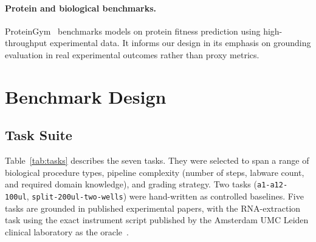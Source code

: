 \documentclass[11pt,a4paper]{article}
\begin{document}
\paragraph{Protein and biological benchmarks.}
ProteinGym~\citep{notin2023proteingym} benchmarks models on protein fitness
prediction using high-throughput experimental data.
It informs our design in its emphasis on grounding evaluation in real
experimental outcomes rather than proxy metrics.

\section{Benchmark Design}
\label{sec:design}

\subsection{Task Suite}
\label{sec:tasks}

Table~\ref{tab:tasks} describes the seven tasks.
They were selected to span a range of biological procedure types, pipeline
complexity (number of steps, labware count, and required domain knowledge),
and grading strategy.
Two tasks (\texttt{a1-a12-100ul}, \texttt{split-200ul-two-wells}) were
hand-written as controlled baselines.
Five tasks are grounded in published experimental papers, with the
RNA-extraction task using the exact instrument script published by the
Amsterdam UMC Leiden clinical laboratory as the oracle~\citep{steur2021hulp}.
\end{document}

